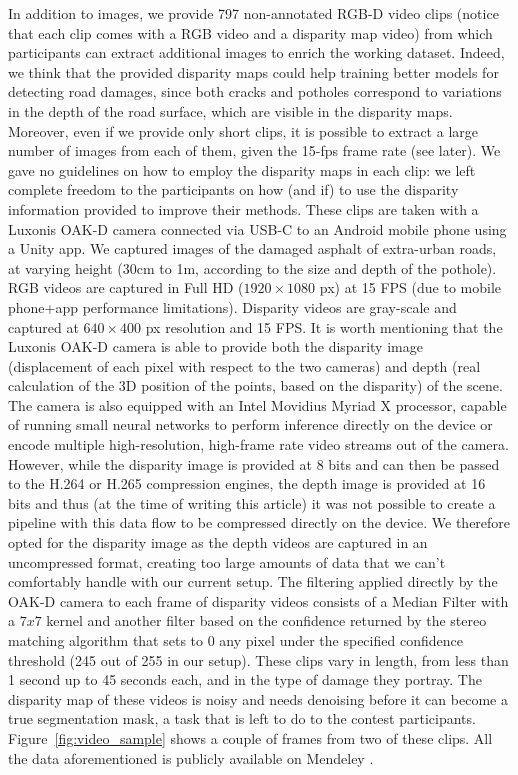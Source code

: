 \documentclass[twocolumn]{article}
\newcommand{\Bhref}[3][blue]{\href{#2}{\color{#1}{#3}}}
\begin{document}
In addition to images, we provide 797 non-annotated RGB-D video clips (notice that each clip comes with a RGB video and a disparity map video) from which participants can extract additional images to enrich the working dataset. Indeed, we think that the provided disparity maps could help training better models for detecting road damages, since both cracks and potholes correspond to variations in the depth of the road surface, which are visible in the disparity maps. Moreover, even if we provide only short clips, it is possible to extract a large number of images from each of them, given the 15-fps frame rate (see later). We gave no guidelines on how to employ the disparity maps in each clip: we left complete freedom to the participants on how (and if) to use the disparity information provided to improve their methods. These clips are taken with a Luxonis OAK-D camera connected via USB-C to an Android mobile phone using a Unity app. We captured images of the damaged asphalt of extra-urban roads, at varying height (30cm to 1m, according to the size and depth of the pothole). RGB videos are captured in Full HD ($1920\times1080$ px) at 15 FPS (due to mobile phone+app performance limitations). Disparity videos are gray-scale and captured at $640\times400$ px resolution and 15 FPS.
It is worth mentioning that the Luxonis OAK-D camera is able to provide both the disparity image (displacement of each pixel with respect to the two cameras) and depth (real calculation of the 3D position of the points, based on the disparity) of the scene. The camera is also equipped with an Intel Movidius Myriad X processor, capable of running small neural networks to perform inference directly on the device or encode multiple high-resolution, high-frame rate video streams out of the camera. However, while the disparity image is provided at 8 bits and can then be passed to the H.264 or H.265 compression engines, the depth image is provided at 16 bits and thus (at the time of writing this article) it was not possible to create a pipeline with this data flow to be compressed directly on the device.
We therefore opted for the disparity image as the depth videos are captured in an uncompressed format, creating too large amounts of data that we can't comfortably handle with our current setup. The filtering applied directly by the OAK-D camera to each frame of disparity videos consists of a Median Filter with a $7x7$ kernel and another filter based on the confidence returned by the stereo matching algorithm that sets to 0 any pixel under the specified confidence threshold (245 out of 255 in our setup). These clips vary in length, from less than 1 second up to 45 seconds each, and in the type of damage they portray. The disparity map of these videos is noisy and needs denoising before it can become a true segmentation mask, a task that is left to do to the contest participants. Figure~\ref{fig:video_sample} shows a couple of frames from two of these clips. All the data aforementioned is publicly available on Mendeley \Bhref{https://data.mendeley.com/datasets/kfth5g2xk3/1}{at this link}.
\end{document}
